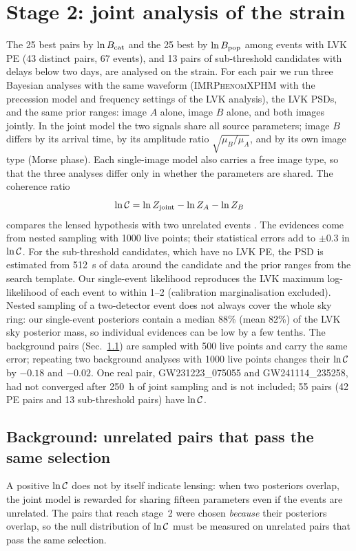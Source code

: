 \section{Stage 2: joint analysis of the strain}
\label{sec:stage2}
The 25 best pairs by $\ln B_{\rm cat}$ and the 25 best by $\ln B_{\rm pop}$ among events with LVK PE (43 distinct pairs, 67 events), and 13 pairs of sub-threshold candidates with delays below two days, are analysed on the strain. For each pair we run three Bayesian analyses with the same waveform (\textsc{IMRPhenomXPHM} with the precession model and frequency settings of the LVK analysis), the LVK PSDs, and the same prior ranges: image $A$ alone, image $B$ alone, and both images jointly. In the joint model the two signals share all source parameters; image $B$ differs by its arrival time, by its amplitude ratio $\sqrt{\mu_B/\mu_A}$, and by its own image type (Morse phase). Each single-image model also carries a free image type, so that the three analyses differ only in whether the parameters are shared. The coherence ratio
\begin{equation}
\ln\mathcal C=\ln Z_{\rm joint}-\ln Z_A-\ln Z_B
\label{eq:lnc}
\end{equation}
compares the lensed hypothesis with two unrelated events \citep{haris2018identifying,janquart2023golum}. The evidences come from nested sampling with 1000 live points; their statistical errors add to $\pm0.3$ in $\ln\mathcal C$. For the sub-threshold candidates, which have no LVK PE, the PSD is estimated from 512~s of data around the candidate and the prior ranges from the search template. Our single-event likelihood reproduces the LVK maximum log-likelihood of each event to within 1--2 (calibration marginalisation excluded). Nested sampling of a two-detector event does not always cover the whole sky ring: our single-event posteriors contain a median 88\% (mean 82\%) of the LVK sky posterior mass, so individual evidences can be low by a few tenths. The background pairs (Sec.~\ref{sec:twins}) are sampled with 500 live points and carry the same error; repeating two background analyses with 1000 live points changes their $\ln\mathcal C$ by $-0.18$ and $-0.02$. One real pair, GW231223\_075055 and GW241114\_235258, had not converged after 250~h of joint sampling and is not included; 55 pairs (42 PE pairs and 13 sub-threshold pairs) have $\ln\mathcal C$.

\subsection{Background: unrelated pairs that pass the same selection}
\label{sec:twins}
A positive $\ln\mathcal C$ does not by itself indicate lensing: when two posteriors overlap, the joint model is rewarded for sharing fifteen parameters even if the events are unrelated. The pairs that reach stage~2 were chosen \emph{because} their posteriors overlap, so the null distribution of $\ln\mathcal C$ must be measured on unrelated pairs that pass the same selection.

